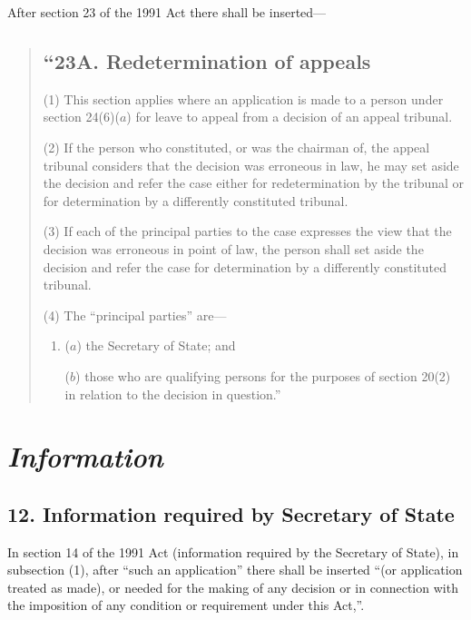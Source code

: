 \documentclass[12pt,a4paper]{article}
\begin{document}
After section 23 of the 1991 Act there shall be inserted—
\begin{quotation}
\subsection*{“23A. Redetermination of appeals}

(1) This section applies where an application is made to a person under section 24(6)($a$)  for leave to appeal from a decision of an appeal tribunal.

(2) If the person who constituted, or was the chairman of, the appeal tribunal considers that the decision was erroneous in law, he may set aside the decision and refer the case either for redetermination by the tribunal or for determination by a differently constituted tribunal.

(3) If each of the principal parties to the case expresses the view that the decision was erroneous in point of law, the person shall set aside the decision and refer the case for determination by a differently constituted tribunal.

(4) The “principal parties” are—
\begin{enumerate}\item[]
($a$) the Secretary of State; and

($b$) those who are qualifying persons for the purposes of section 20(2)  in relation to the decision in question.”
\end{enumerate}
\end{quotation}

\section{\itshape Information}

\subsection{12. Information required by Secretary of State}

In section 14 of the 1991 Act (information required by the Secretary of State), in subsection (1), after “such an application” there shall be inserted “(or application treated as made), or needed for the making of any decision or in connection with the imposition of any condition or requirement under this Act,”.

\end{document}
